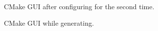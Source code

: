 \documentclass[fleqn,12pt,openany]{book}
\begin{document}
\begin{figure}[H]
\caption{CMake GUI after configuring for the second time.}
\end{figure}

\begin{figure}[H]
\caption{CMake GUI while generating.}
\end{figure}
\end{document}
